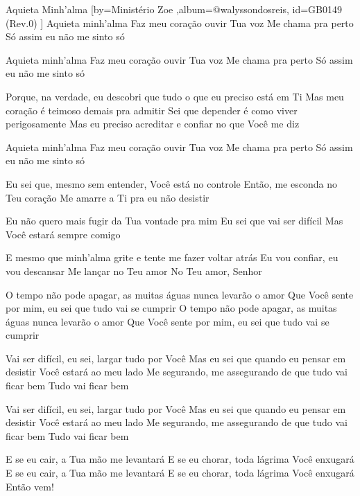\beginsong
{Aquieta Minh'alma %
}[by={Ministério Zoe %
},album={@walyssondosreis},
id={GB0149 %
(Rev.0) %
}]
Aquieta minh'alma
Faz meu coração ouvir Tua voz
Me chama pra perto
Só assim eu não me sinto só

Aquieta minh'alma
Faz meu coração ouvir Tua voz
Me chama pra perto
Só assim eu não me sinto só

Porque, na verdade, eu descobri que tudo o que eu preciso está em Ti
Mas meu coração é teimoso demais pra admitir
Sei que depender é como viver perigosamente
Mas eu preciso acreditar e confiar no que Você me diz

Aquieta minh'alma
Faz meu coração ouvir Tua voz
Me chama pra perto
Só assim eu não me sinto só

Eu sei que, mesmo sem entender, Você está no controle
Então, me esconda no Teu coração
Me amarre a Ti pra eu não desistir

Eu não quero mais fugir da Tua vontade pra mim
Eu sei que vai ser difícil
Mas Você estará sempre comigo

E mesmo que minh'alma grite e tente me fazer voltar atrás
Eu vou confiar, eu vou descansar
Me lançar no Teu amor
No Teu amor, Senhor

O tempo não pode apagar, as muitas águas nunca levarão o amor
Que Você sente por mim, eu sei que tudo vai se cumprir
O tempo não pode apagar, as muitas águas nunca levarão o amor
Que Você sente por mim, eu sei que tudo vai se cumprir

Vai ser difícil, eu sei, largar tudo por Você
Mas eu sei que quando eu pensar em desistir
Você estará ao meu lado
Me segurando, me assegurando de que tudo vai ficar bem
Tudo vai ficar bem

Vai ser difícil, eu sei, largar tudo por Você
Mas eu sei que quando eu pensar em desistir
Você estará ao meu lado
Me segurando, me assegurando de que tudo vai ficar bem
Tudo vai ficar bem

E se eu cair, a Tua mão me levantará
E se eu chorar, toda lágrima Você enxugará
E se eu cair, a Tua mão me levantará
E se eu chorar, toda lágrima Você enxugará
Então vem!


